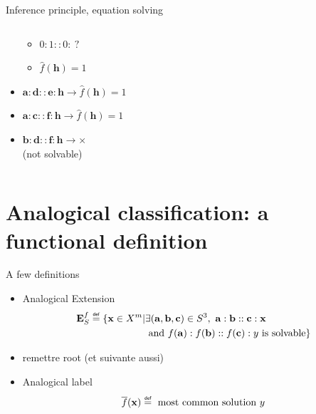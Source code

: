 \documentclass{beamer}
\begin{document}
\begin{frame}{Inference principle, equation solving}
\begin{columns}
\begin{column}{0.5\textwidth}
\begin{itemize}
{\begin{itemize}
            \item $0:1::0:~?$
            \item $\hat{f}(\mathbf{h}) = 1$
          \end{itemize}
            }
        \item $\mathbf{a} : \mathbf{d} :: \mathbf{e} : \mathbf{h}\rightarrow
          \hat{f}(\mathbf{h}) = 1$
        \item $\mathbf{a} : \mathbf{c} :: \mathbf{f} : \mathbf{h}\rightarrow
          \hat{f}(\mathbf{h}) = 1$
        \item $\mathbf{b} : \mathbf{d} :: \mathbf{f} : \mathbf{h}\rightarrow
          \times$\\(not solvable)
      \end{itemize}

    \end{column}
  \end{columns}
\end{frame}

\section[Analogical classification]{Analogical classification: a functional definition}

\begin{frame}{A few definitions}
  \begin{itemize}
    \item \alert{Analogical Extension}
        \begin{align*}
          \esf \eqdef \{ \mathbf{x} \in X^m |  &\exists
          (\mathbf{a},\mathbf{b},\mathbf{c}) \in S^3, ~ \mathbf{a} : \mathbf{b}
          :: \mathbf{c} : \mathbf{x}\\
          &\text{ and } f(\mathbf{a}) : f(\mathbf{b}) ::
          f(\mathbf{c}) : y \text{ is solvable}\}
        \end{align*}

      \item remettre root (et suivante aussi)

    \item \alert{Analogical label}
      $$\albl{\mathbf{x}} \eqdef \text{ most common solution }y$$
  \end{itemize}
\end{frame}
\end{document}
